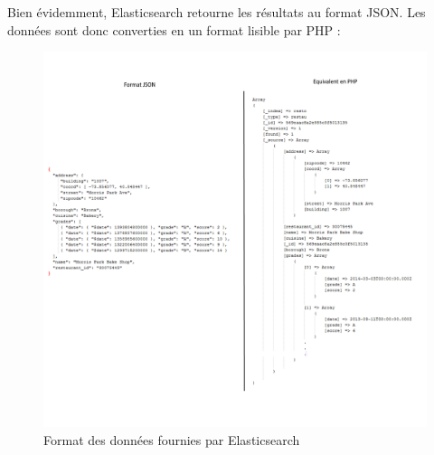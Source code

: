 Bien évidemment, Elasticsearch retourne les résultats au format JSON. Les données sont donc converties en un format lisible par PHP :

\begin{figure}[H]
        \centering
        \includegraphics[width=\textwidth]{figure/dataJSONPHP.png}
            \caption{Format des données fournies par Elasticsearch}
            \label{fig:datajsonPhp}
\end{figure}
